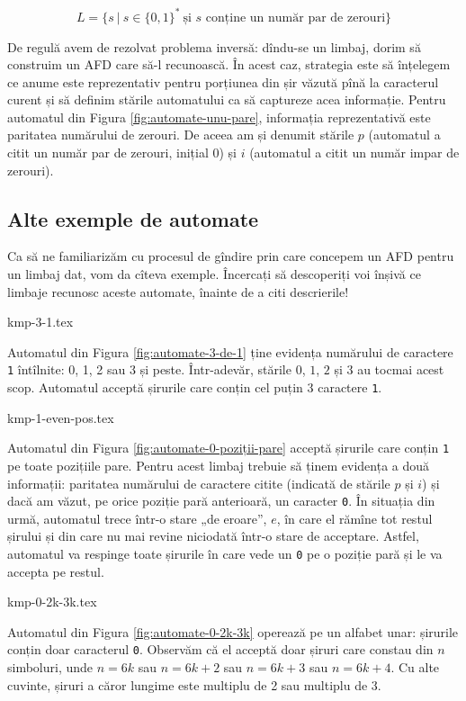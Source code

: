 \documentclass[../main.tex]{subfiles}
\begin{document}
$$L = \{ s\ |\ s \in \{0, 1\}^{*}\ \textrm{și $s$ conține un număr par de
  zerouri} \}$$

De regulă avem de rezolvat problema inversă: dîndu-se un limbaj, dorim să
construim un AFD care să-l recunoască. În acest caz, strategia este să
înțelegem ce anume este reprezentativ pentru porțiunea din șir văzută pînă la
caracterul curent și să definim stările automatului ca să captureze acea
informație. Pentru automatul din Figura \ref{fig:automate-unu-pare},
informația reprezentativă este paritatea numărului de zerouri. De aceea am și
denumit stările $p$ (automatul a citit un număr par de zerouri, inițial 0) și
$i$ (automatul a citit un număr impar de zerouri).


\subsection{Alte exemple de automate}

Ca să ne familiarizăm cu procesul de gîndire prin care concepem un AFD pentru
un limbaj dat, vom da cîteva exemple. Încercați să descoperiți voi înșivă ce
limbaje recunosc aceste automate, înainte de a citi descrierile!

{kmp-3-1.tex}

Automatul din Figura \ref{fig:automate-3-de-1} ține evidența
numărului de caractere \texttt{1} întîlnite: 0, 1, 2 sau 3 și
peste. Într-adevăr, stările $0$, $1$, $2$ și $3$ au tocmai acest
scop. Automatul acceptă șirurile care conțin cel puțin 3 caractere \texttt{1}.

{kmp-1-even-pos.tex}

Automatul din Figura \ref{fig:automate-0-poziții-pare} acceptă șirurile
care conțin \texttt{1} pe toate pozițiile pare. Pentru acest limbaj trebuie să
ținem evidența a două informații: paritatea numărului de caractere citite
(indicată de stările $p$ și $i$) și dacă am văzut, pe orice poziție pară
anterioară, un caracter \texttt{0}. În situația din urmă, automatul trece
într-o stare „de eroare”, $e$, în care el rămîne tot restul șirului și din
care nu mai revine niciodată într-o stare de acceptare. Astfel, automatul va
respinge toate șirurile în care vede un \texttt{0} pe o poziție pară și le va
accepta pe restul.

{kmp-0-2k-3k.tex}

Automatul din Figura \ref{fig:automate-0-2k-3k} operează pe un alfabet unar:
șirurile conțin doar caracterul \texttt{0}. Observăm că el acceptă doar șiruri
care constau din $n$ simboluri, unde $n=6k$ sau $n=6k+2$ sau $n=6k+3$ sau
$n=6k+4$. Cu alte cuvinte, șiruri a căror lungime este multiplu de 2 sau
multiplu de 3.
\end{document}
